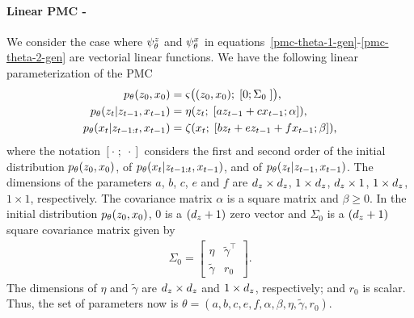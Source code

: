 \paragraph{Linear PMC -}
We consider the  case where  $\psi^{z}_{\theta}$ and $\psi^{x}_{\theta}$ in
equations~\eqref{pmc-theta-1-gen}-\eqref{pmc-theta-2-gen} are 
vectorial linear  functions.
We have the following linear parameterization of the PMC
\begin{align}
    \label{eq:linear_pmc1}
    \p(\latent_0, \obs_0) &= \varsigma \big( (\latent_0, \obs_0); \;[ 0 ;  \Sigma_0 \;] \big) \text{,}\\
    \label{eq:linear_pmc2}
    \p(\latent_t|\latent_{t-1},\obs_{t-1})&= \eta(\latent_t; \;[ a\latent_{t-1}+ c\obs_{t-1}; \alpha ])  \text{,} \\%
    \label{eq:linear_pmc3}
    \p(\obs_t|\latent_{t-1:t}, \obs_{t-1})&= \zeta(\obs_t; \;[ b\latent_{t} + e \latent_{t-1}+f\obs_{t-1} ; \beta ])\text{,} %
\end{align}
where the notation $[\cdot \; ; \; \cdot]$
considers the first and second order of the initial distribution $p_{\theta}(z_0, x_0)$,
of  $p_{\theta}(x_t | z_{t-1:t}, x_{t-1})$,
and of $p_{\theta}(z_t | z_{t-1}, x_{t-1})$.
The dimensions of the parameters $a$, $b$, $c$, $e$ and $f$ %
are 
$d_{z}  \times  d_{z}$,
$1  \times  d_{z}$,
$d_{z}  \times  1 $,
$1 \times  d_{z}$, 
$1 \times 1 $,
respectively.
The covariance matrix $\alpha$ is a square matrix and $\beta \geq 0$.
In the initial distribution  $p_{\theta}(z_0, x_0)$, $0$ 
is a $(d_{z} + 1 )$ zero vector and $\Sigma_0$ is a $(d_{z} + 1 )$
square covariance matrix given by
\begin{align*}
    \Sigma_0 = \begin{bmatrix} \eta & \tilde{\gamma}^\intercal \\ \tilde{\gamma}& r_0 \end{bmatrix} \text{.}
\end{align*}
The dimensions of $\eta$ and $\tilde{\gamma}$ are $d_{z}  \times d_{z} $ and $1 \times  d_{z}$,
respectively; and $r_0$ is scalar.
Thus, the set of parameters now is $\theta=(a,b,c,e,f,\alpha,\beta,\eta,\tilde{\gamma}, r_0)$.


